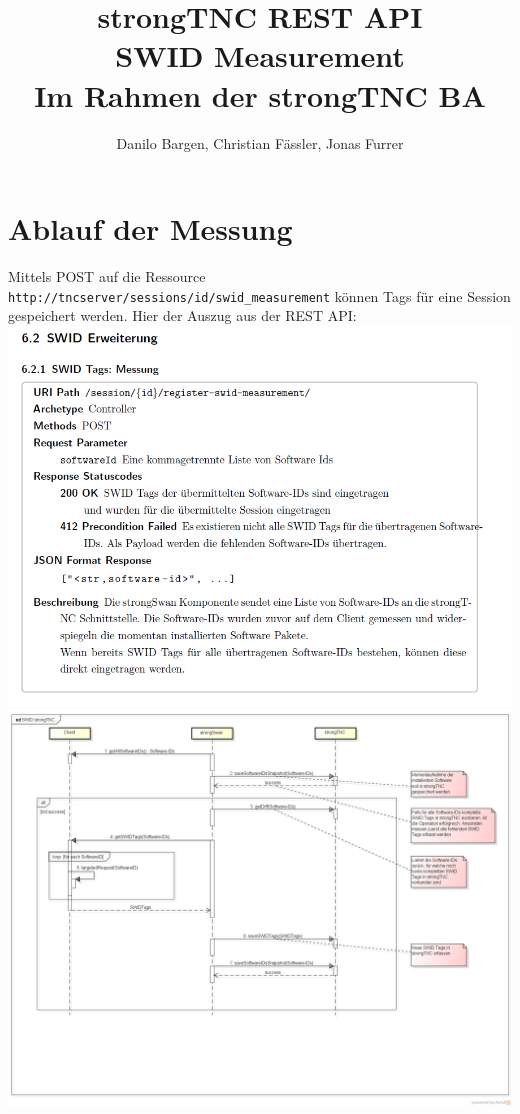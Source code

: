\documentclass[10pt,a4paper]{scrartcl}
\author{Danilo Bargen, Christian Fässler, Jonas Furrer}
\title{strongTNC REST API\\SWID Measurement \\ \small{Im Rahmen der strongTNC BA} }
\begin{document}
\begin{titlepage}
	\maketitle
	\vspace{120mm}
	\thispagestyle{empty} %
\end{titlepage}

\newpage
	\tableofcontents
\newpage

\section{Ablauf der Messung}
Mittels POST auf die Ressource \texttt{http://tncserver/sessions/id/swid\_measurement} können Tags für eine Session gespeichert werden.
Hier der Auszug aus der REST API: \\
\includegraphics[scale=0.5]{swid-measurement-api.jpg}
\includegraphics[scale=0.25]{../images/architecture/SWID_strongTNC.png}
\end{document}
